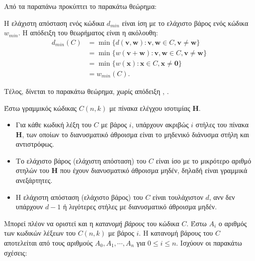 Από τα παραπάνω προκύπτει το παρακάτω θεώρημα:

\begin{theorem}
Η ελάχιστη απόσταση ενός κώδικα $d_{min}$ είναι ίση με το ελάχιστο βάρος ενός κώδικα $w_{min}$. Η απόδειξη του θεωρήματος είναι η ακόλουθη:
\begin{equation}
\begin{split}
d_{min}(C) & = \min \lbrace d \left( \mathbf{v},\mathbf{w} \right) : \mathbf{v},\mathbf{w} \in C, \mathbf{v}\neq\mathbf{w} \rbrace \\
& = \min \lbrace w \left( \mathbf{v}+\mathbf{w} \right) : \mathbf{v},\mathbf{w} \in C, \mathbf{v}\neq\mathbf{w} \rbrace \\
& = \min \lbrace w \left( \mathbf{x} \right) : \mathbf{x} \in C, \mathbf{x}\neq\mathbf{0} \rbrace \\
& = w_{min}(C).
\end{split}
\end{equation}
\label{theorem:min distance}
\end{theorem}

Τέλος, δίνεται το παρακάτω θεώρημα, χωρίς απόδειξη \cite{ryan2009channel}, \cite{peterson1972error}.

\begin{theorem}
Έστω γραμμικός  κώδικας $C(n,k)$ με πίνακα ελέγχου ισοτιμίας $\mathbf{H}$.
\begin{itemize}
\item Για κάθε κωδική λέξη του $C$ με βάρος $i$, υπάρχουν ακριβώς $i$ στήλες του πίνακα $\mathbf{H}$, των οποίων το διανυσματικό άθροισμα είναι το μηδενικό διάνυσμα στήλη και αντιστρόφως.
\item Το ελάχιστο βάρος (ελάχιστη απόσταση) του $C$ είναι ίσο με το μικρότερο αριθμό στηλών του $\mathbf{H}$ που έχουν διανυσματικό άθροισμα μηδέν, δηλαδή είναι γραμμικά ανεξάρτητες.
\item Η ελάχιστη απόσταση (ελάχιστο βάρος) του $C$ είναι τουλάχιστον $d$, ανν δεν υπάρχουν $d-1$ ή λιγότερες στήλες με διανυσματικό άθροισμα μηδέν.
\end{itemize}
\label{theorem:distance weight parity check matrix}
\end{theorem}

Μπορεί πλέον να οριστεί και η \textit{κατανομή βάρους} του κώδικα $C$. Έστω $A_i$ ο αριθμός των κωδικών λέξεων του $C(n,k)$ με βάρος  $i$. Η κατανομή βάρους του $C$ αποτελείται από τους αριθμούς $A_0,A_1,\cdots,A_n$ για $0\leq i \leq n$. Ισχύουν οι παρακάτω σχέσεις:

